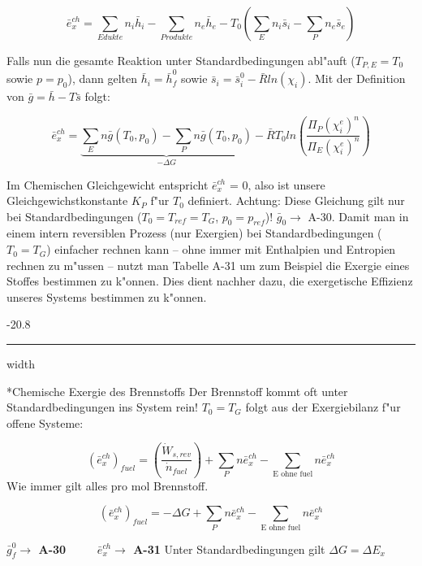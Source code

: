 \documentclass[8pt, landscape, fleqn]{scrartcl}
\makeatletter
\renewcommand{\subsubsection}{\@startsection{subsubsection}{1}{0mm}%
{-2\baselineskip}{0.8\baselineskip}%
{\hrule depth 0.2pt width\columnwidth\vspace*{1.2em}\normalsize\bfseries\rmfamily}}
\makeatother
\begin{document}
\begin{multicols*}{3}
\begin{equation}
\bar{e}_x^{ch} = \sum_{Edukte} n_i \bar{h}_i - \sum_{Produkte} n_e \bar{h}_e - T_0 \left( \sum_{E} n_i \bar{s}_i - \sum_{P} n_e \bar{s}_e \right)
\end{equation}

Falls nun die gesamte Reaktion unter Standardbedingungen abl"auft ($T_{P,E}=T_0$ sowie $p=p_0$), dann gelten $\bar{h}_i= \bar{h}_f^0$ sowie $ \bar{s}_i = \bar{s}_i^0 - \bar{R} ln(\chi_i)$. Mit der Definition von $\bar{g}= \bar{h} - T \bar{s}$ folgt:

\begin{equation}
\bar{e}_x^{ch} = \underbrace{\sum_{E} n \bar{g}(T_0,p_0) - \sum_{P} n \bar{g}(T_0,p_0)}_{-\Delta G} - \bar{R} T_0 ln \left( \frac{\Pi_P (\chi_i^e)^n}{\Pi_E (\chi_i^e)^n} \right)
\end{equation}

Im Chemischen Gleichgewicht entspricht $\bar{e}_x^{ch} $ = 0, also ist unsere Gleichgewichstkonstante $K_P$ f"ur $T_0$ definiert. Achtung: Diese Gleichung gilt nur bei Standardbedingungen ($T_0 = T_{ref} = T_{G}$, $p_0 = p_{ref}$)! $\bar{g}_0 \rightarrow$ A-30. Damit man in einem intern reversiblen Prozess (nur Exergien) bei Standardbedingungen ($T_0=T_G$) einfacher rechnen kann -- ohne immer mit Enthalpien und Entropien rechnen zu m"ussen -- nutzt man Tabelle A-31 um zum Beispiel die Exergie eines Stoffes bestimmen zu k"onnen. Dies dient nachher dazu, die exergetische Effizienz unseres Systems bestimmen zu k"onnen.


\subsubsection*{Chemische Exergie des Brennstoffs}
Der Brennstoff kommt oft unter Standardbedingungen ins System rein! $T_0=T_G$ folgt aus der Exergiebilanz f"ur offene Systeme:

\begin{equation}
\left(\bar{e}_x^{ch}\right)_{fuel} = \left( \frac{\dot{W}_{s,rev}}{\dot{n}_{fuel}}\right) + \sum_P n \bar{e}_x^{ch} -\sum_{\text{E ohne fuel}} n \bar{e}_x^{ch}
\end{equation} 
Wie immer gilt alles pro mol Brennstoff.

\begin{equation}
\left(\bar{e}_x^{ch}\right)_{fuel} = -\Delta G + \sum_P n \bar{e}_x^{ch} -\sum_{\text{E ohne fuel}} n \bar{e}_x^{ch}
\end{equation} 

{\bf{$\bar{g}_f^{0} \rightarrow$ A-30 $\qquad$ $\bar{e}_x^{ch} \rightarrow$ A-31}}
\newline
\newline
Unter Standardbedingungen gilt $\Delta G = \Delta E_x$


\end{multicols*}
\end{document}
